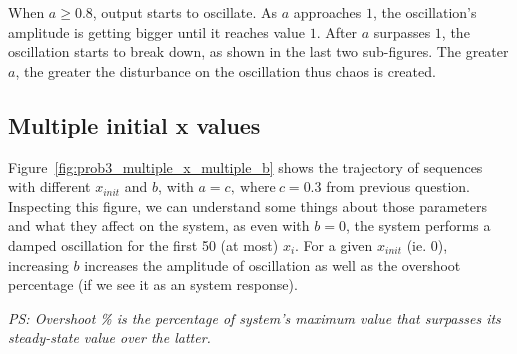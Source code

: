 When $a \ge 0.8$, output starts to oscillate. As $a$ approaches $1$, the oscillation's amplitude is getting bigger until it reaches value $1$.
After $a$ surpasses $1$, the oscillation starts to break down, as shown in the last two sub-figures. The greater $a$, the greater the disturbance on the oscillation thus chaos is created.

\subsection{Multiple initial x values}

Figure~\ref{fig:prob3_multiple_x_multiple_b} shows the trajectory of sequences with different $x_{init}$ and $b$, with $a = c, \ \text{where} \ c = 0.3$ from previous question.
Inspecting this figure, we can understand some things about those parameters and what they affect on the system, as even with $b=0$, the system performs a damped oscillation for the first 50 (at most) $x_i$.
For a given $x_{init}$ (ie. $0$), increasing $b$ increases the amplitude of oscillation as well as the overshoot percentage (if we see it as an system response).

\textit{\footnotesize PS: Overshoot \% is the percentage of system's maximum value that surpasses its steady-state value over the latter.}


